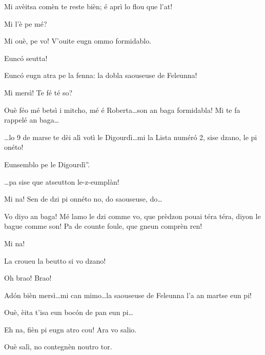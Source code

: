 \begin{drama}
 Mi avèitsa comèn te reste bièn; é aprì lo flou que l'at!

\Jeanspeaks Mi l'è pe mé?

\Cimaspeaks Mi ouè, pe vo! V'ouite eugn ommo formidablo.


\Marcospeaks Eunc\'o seutta!

\Cimaspeaks Eunc\'o eugn atra pe la fenna: la dobla saouseuse de Feleunna!

\Jeanspeaks Mi mersì! Te fé té so?

\Cimaspeaks Ouè féo mé betsì i mitcho, mé é Roberta\ldots son an baga formidabla! Mi te fa rappelé an baga\ldots


\Cimaspeaks \ldots lo 9 de marse te dèi alì votì le Digourdì\ldots mi la Lista num\'er\'o 2, sise dzano, le pi onéto!


\Jeanspeaks {} \og Eunsemblo pe le Digourdì''.

\Marcospeaks \ldots pa sise que atseutton le-z-eumplàn!

\Cimaspeaks Mi na! Sen de dzi pi onnéto no, do saouseuse, do\ldots

\Jeanspeaks  Vo diyo an baga! Mé lamo le dzi comme vo, que prèdzon pouai téra téra, diyon le bague comme son! Pa de counte foule, que gneun comprèn ren!

\Cimaspeaks Mi na! 

\Jeanspeaks La croueu la beutto si vo dzano!

\CimaMarcospeaks Oh brao! Brao!

\Cimaspeaks Ad\'on bièn mersì\ldots mi can mimo\ldots la saouseuse de Feleunna l'a an martse eun pi!

\Jeanspeaks Ouè, èita t'isa eun boc\'on de pan eun pi\ldots

\Cimaspeaks Eh na, fièn pi eugn atro cou! Ara vo salio.

\Marcospeaks Ouè  salì, no contegnèn noutro tor.




\end{drama}
